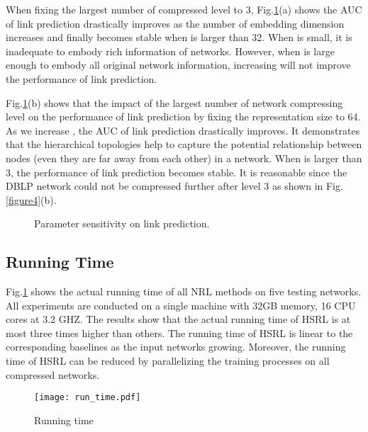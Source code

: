 \documentclass[conference]{IEEEtran}
\begin{document}
When fixing the largest number of compressed level to 3, Fig.\ref{figure6}(a) shows the AUC of link prediction drastically improves as the number of embedding dimension  increases and finally becomes stable when  is larger than 32. When  is small, it is inadequate to embody rich information of networks. However, when  is large enough to embody all original network information, increasing  will not improve the performance of link prediction.

Fig.\ref{figure6}(b) shows that the impact of the largest number of network compressing level  on the performance of link prediction by fixing the representation size  to 64. As we increase , the AUC of link prediction drastically improves. It demonstrates that the hierarchical topologies help to capture the potential relationship between nodes (even they are far away from each other) in a network. When  is larger than 3, the performance of link prediction becomes stable. It is reasonable since the DBLP network could not be compressed further after level 3 as shown in Fig.\ref{figure4}(b).

\begin{figure}
	\centering
	\caption{{\small Parameter sensitivity on link prediction.}}\label{figure6}
\end{figure}

\subsection{Running Time}
Fig.\ref{figure6} shows the actual running time of all NRL methods on five testing networks. All experiments are conducted on a single machine with 32GB memory, 16 CPU cores at 3.2 GHZ. The results show that the actual running time of HSRL is at most three times higher than others. The running time of HSRL is linear to the corresponding baselines as the input networks growing. Moreover, the running time of HSRL can be reduced by parallelizing the training processes on all compressed networks.
\begin{figure}
	\centering
	\texttt{[image: run\_time.pdf]}
	\caption{Running time}
	\label{figure7}
\end{figure}
\end{document}
